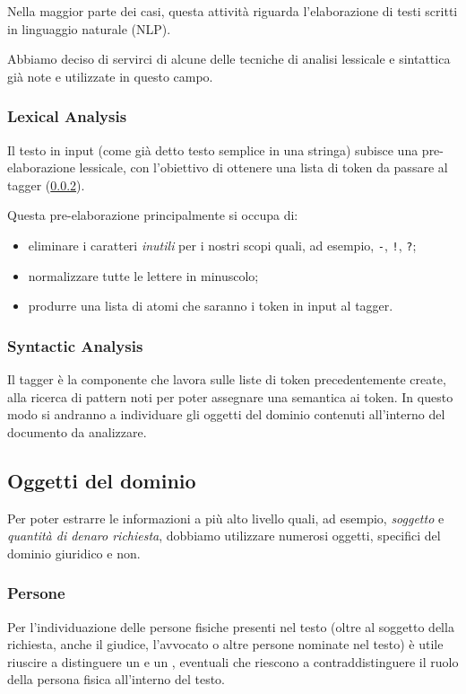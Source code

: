 Nella maggior parte dei casi, questa attività riguarda l'elaborazione di testi scritti in linguaggio naturale (NLP).

Abbiamo deciso di servirci di alcune delle tecniche di analisi lessicale e sintattica già note e utilizzate in questo campo.

\subsubsection{Lexical Analysis}
Il testo in input (come già detto testo semplice in una stringa) subisce una pre-elaborazione lessicale, con l'obiettivo di ottenere una lista di token da passare al tagger (\ref{tagger}).

Questa pre-elaborazione principalmente si occupa di:
\begin{itemize}
\item eliminare i caratteri \emph{inutili} per i nostri scopi quali, ad esempio, \verb+-+, \verb+!+, \verb+?+;
\item normalizzare tutte le lettere in minuscolo;
\item produrre una lista di atomi che saranno i token in input al tagger.
\end{itemize}

\subsubsection{Syntactic Analysis}
\label{tagger}
Il tagger è la componente che lavora sulle liste di token precedentemente create, alla ricerca di pattern noti per poter assegnare una semantica ai token. In questo modo si andranno a individuare gli oggetti del dominio contenuti all'interno del documento da analizzare.

\subsection{Oggetti del dominio}
Per poter estrarre le informazioni a più alto livello quali, ad esempio, \emph{soggetto} e \emph{quantità di denaro richiesta}, dobbiamo utilizzare numerosi oggetti, specifici del dominio giuridico e non.

\subsubsection{Persone}
Per l'individuazione delle persone fisiche presenti nel testo (oltre al soggetto della richiesta, anche il giudice, l'avvocato o altre persone nominate nel testo) è utile riuscire a distinguere un  e un , eventuali  che riescono a contraddistinguere il ruolo della persona fisica all'interno del testo.


